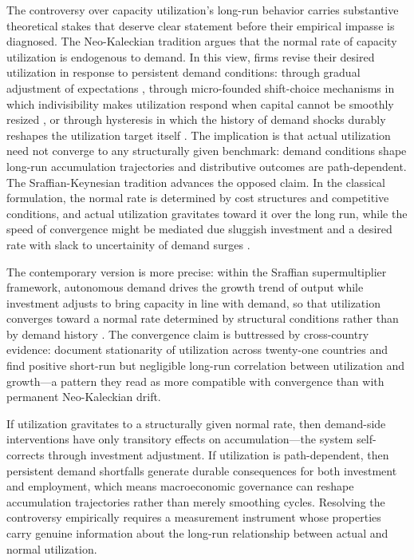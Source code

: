 \documentclass[11pt,a4paper]{article}
\begin{document}
The controversy over capacity utilization's long-run behavior carries substantive theoretical stakes that deserve clear statement before their empirical impasse is diagnosed. The Neo-Kaleckian tradition argues that
the normal rate of capacity utilization is endogenous to demand. In this view, firms revise their desired utilization in response to persistent demand conditions: through gradual adjustment of expectations \citep{Lavoie1995}, through micro-founded shift-choice mechanisms in which indivisibility makes utilization respond when capital cannot be smoothly resized \citep{Nikiforos2013}, or through hysteresis in which the history of demand shocks durably reshapes the utilization target itself \citep{Setterfield2020}. The implication is that actual utilization need not converge to any structurally given benchmark: demand conditions shape long-run accumulation trajectories and distributive outcomes are path-dependent. The Sraffian-Keynesian tradition advances the opposed claim. In the classical formulation, the
normal rate is determined by cost structures and competitive conditions, and actual utilization gravitates toward it over the long run, while the speed of convergence might be mediated due sluggish investment and a desired rate with slack to uncertainity of demand surges \citep{Ciccone1986}. 

The contemporary version is more precise: within the Sraffian supermultiplier framework, autonomous demand drives the growth trend of output while investment adjusts to bring capacity in line with demand, so that utilization converges toward a normal rate determined by structural conditions rather than by demand history \citep{Girardi2016}. The convergence claim is buttressed by cross-country evidence: \citet{GahnGonzalez2022} document stationarity of utilization across twenty-one countries and find positive short-run but negligible long-run correlation between utilization and growth---a pattern they read as more compatible with convergence than with permanent Neo-Kaleckian drift.

If utilization gravitates to a structurally given normal rate, then demand-side interventions have only transitory effects on accumulation---the system self-corrects through investment adjustment. If utilization is path-dependent, then persistent demand shortfalls generate durable consequences for both investment and employment, which means macroeconomic governance can reshape accumulation trajectories rather than merely smoothing cycles. Resolving the controversy empirically requires a measurement instrument whose properties carry genuine information about the long-run relationship between actual and normal utilization. 
\end{document}
